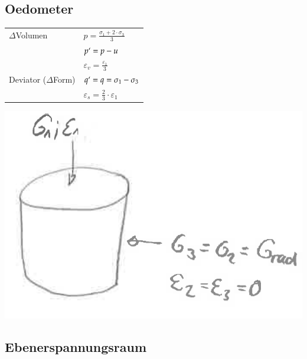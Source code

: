 	
	\begin{minipage}{0.35\linewidth}
\subsection{Oedometer}
\begin{tabular}{ll}
		$\Delta$Volumen		& $p= \frac{\sigma_1 + 2 \cdot \sigma_3}{3}$ \\
							& $p`= p - u$ \\
							& $\varepsilon_v= \frac{\varepsilon_1}{3}$ \\
		Deviator ($\Delta$Form) &$q`= q = \sigma_1 - \sigma_3$ \\
							& $\varepsilon_s= \frac{2}{3} \cdot \varepsilon_1$ \\
	\end{tabular}
\end{minipage}
\begin{minipage}{0.5\linewidth}
	\includegraphics[width=0.5\linewidth]{images/MC1Oed.PNG}
\end{minipage}



\clearpage

\subsection{Ebenerspannungsraum}

